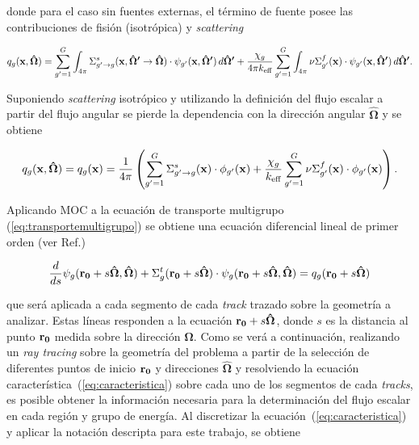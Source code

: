 \documentclass[11pt]{article}
\renewcommand{\vec}[1]{\ensuremath\mathbf{#1}}
\begin{document}
\noindent
donde para el caso sin fuentes externas, el término de fuente posee las contribuciones de fisión (isotrópica) y \emph{scattering}

\begin{equation} \label{eq:fuentemultigrupo-1}
 q_g(\vec{x}, \boldsymbol{\hat{\Omega}}) =
 \sum_{g^\prime=1}^G \int_{4\pi} \Sigma^s_{g^\prime \rightarrow g}(\vec{x}, \boldsymbol{\hat{\Omega}^\prime} \rightarrow \boldsymbol{\hat{\Omega}}) \cdot \psi_{g^\prime}(\vec{x}, \boldsymbol{\hat{\Omega}^\prime}) \, d\boldsymbol{\hat{\Omega}^\prime} 
 + \frac{\chi_g}{4\pi k_{\text{eff}}} \sum_{g^\prime=1}^G \int_{4\pi} \nu\Sigma^f_{g^\prime}(\vec{x}) \cdot \psi_{g^\prime}(\vec{x}, \boldsymbol{\hat{\Omega}^\prime}) \, d\boldsymbol{\hat{\Omega}^\prime}.
\end{equation}

\noindent
Suponiendo \emph{scattering} isotrópico y utilizando la definición del flujo escalar a partir del flujo angular se pierde la dependencia con la dirección angular $\boldsymbol{\hat{\Omega}}$ y se obtiene

\begin{equation} \label{eq:fuentemultigrupo-2}
 q_g(\vec{x}, \boldsymbol{\hat{\Omega}}) = 
 q_g(\vec{x}) = 
 \frac{1}{4\pi} \left(
 \sum_{g^\prime=1}^G \Sigma^s_{g^\prime \rightarrow g}(\vec{x}) \cdot \phi_{g^\prime}(\vec{x})
 + \frac{\chi_g}{k_{\text{eff}}} \sum_{g^\prime=1}^G \nu\Sigma^f_{g^\prime}(\vec{x}) \cdot \phi_{g^\prime}(\vec{x}) 
 \right).
\end{equation}

Aplicando MOC a la ecuación de transporte multigrupo (\ref{eq:transportemultigrupo}) se obtiene una ecuación diferencial lineal de primer orden (ver Ref.\cite{glaston-handbook})

\begin{equation} \label{eq:caracteristica}
 \frac{d}{ds}\psi_g(\vec{r_0}+s\boldsymbol{\hat{\Omega}},\boldsymbol{\hat{\Omega}}) 
 + \Sigma^t_g(\vec{r_0}+s\boldsymbol{\hat{\Omega}}) \cdot \psi_g(\vec{r_0}+s\boldsymbol{\hat{\Omega}}, \boldsymbol{\hat{\Omega}}) = 
 q_g(\vec{r_0}+s\boldsymbol{\hat{\Omega}})
\end{equation}

\noindent
que será aplicada a cada segmento de cada \emph{track} trazado sobre la geometría a analizar. Estas líneas responden a la ecuación $\vec{r_0}+s\boldsymbol{\hat{\Omega}}$, donde $s$ es la distancia al punto $\vec{r_0}$ medida sobre la dirección $\boldsymbol{\hat{\Omega}}$. Como se verá a continuación, realizando un \emph{ray tracing} sobre la geometría del problema a partir de la selección de diferentes puntos de inicio $\vec{r_0}$ y direcciones $\boldsymbol{\hat{\Omega}}$ y resolviendo la ecuación característica~(\ref{eq:caracteristica}) sobre cada uno de los segmentos de cada \emph{tracks}, es posible obtener la información necesaria para la determinación del flujo escalar en cada región y grupo de energía. Al discretizar la ecuación~(\ref{eq:caracteristica}) y aplicar la notación descripta para este trabajo, se obtiene
\end{document}

